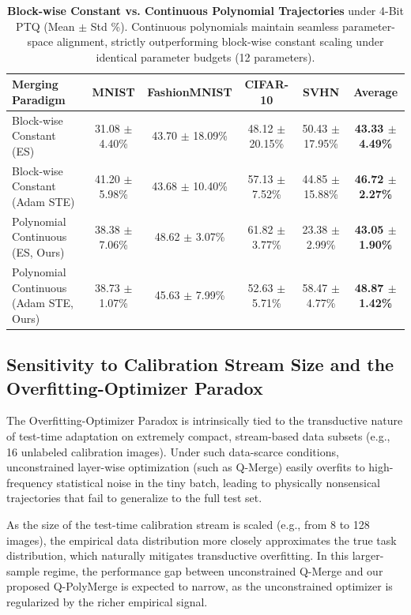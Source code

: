 \begin{table}[h]
\centering
\caption{\textbf{Block-wise Constant vs. Continuous Polynomial Trajectories} under 4-Bit PTQ (Mean $\pm$ Std \%). Continuous polynomials maintain seamless parameter-space alignment, strictly outperforming block-wise constant scaling under identical parameter budgets (12 parameters).}
\label{tab:blockwise_comparison}
\vskip 0.15in
\begin{small}
\begin{sc}
\begin{tabular}{lccccc}
\toprule
Merging Paradigm & MNIST & FashionMNIST & CIFAR-10 & SVHN & Average \\
\midrule
Block-wise Constant (ES) & 31.08 $\pm$ 4.40\% & 43.70 $\pm$ 18.09\% & 48.12 $\pm$ 20.15\% & 50.43 $\pm$ 17.95\% & \textbf{43.33 $\pm$ 4.49\%} \\
Block-wise Constant (Adam STE) & 41.20 $\pm$ 5.98\% & 43.68 $\pm$ 10.40\% & 57.13 $\pm$ 7.52\% & 44.85 $\pm$ 15.88\% & \textbf{46.72 $\pm$ 2.27\%} \\
\midrule
Polynomial Continuous (ES, Ours) & 38.38 $\pm$ 7.06\% & 48.62 $\pm$ 3.07\% & 61.82 $\pm$ 3.77\% & 23.38 $\pm$ 2.99\% & \textbf{43.05 $\pm$ 1.90\%} \\
Polynomial Continuous (Adam STE, Ours) & 38.73 $\pm$ 1.07\% & 45.63 $\pm$ 7.99\% & 52.63 $\pm$ 5.71\% & 58.47 $\pm$ 4.77\% & \textbf{48.87 $\pm$ 1.42\%} \\
\bottomrule
\end{tabular}
\end{sc}
\end{small}
\end{table}

\subsection{Sensitivity to Calibration Stream Size and the Overfitting-Optimizer Paradox}
The Overfitting-Optimizer Paradox is intrinsically tied to the transductive nature of test-time adaptation on extremely compact, stream-based data subsets (e.g., 16 unlabeled calibration images). Under such data-scarce conditions, unconstrained layer-wise optimization (such as Q-Merge) easily overfits to high-frequency statistical noise in the tiny batch, leading to physically nonsensical trajectories that fail to generalize to the full test set.

As the size of the test-time calibration stream is scaled (e.g., from 8 to 128 images), the empirical data distribution more closely approximates the true task distribution, which naturally mitigates transductive overfitting. In this larger-sample regime, the performance gap between unconstrained Q-Merge and our proposed Q-PolyMerge is expected to narrow, as the unconstrained optimizer is regularized by the richer empirical signal.

